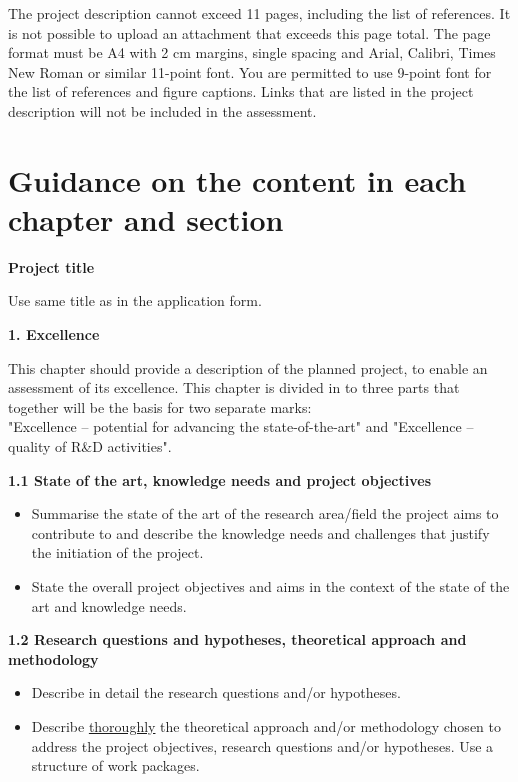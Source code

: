 \documentclass{nfr}
\begin{document}
The project description cannot exceed 11 pages, including the list of
references. It is not possible to upload an attachment that exceeds this
page total. The page format must be A4 with 2 cm margins, single spacing
and Arial, Calibri, Times New Roman or similar 11-point font. You are
permitted to use 9-point font for the list of references and figure
captions. Links that are listed in the project description will not be
included in the assessment.

\section{Guidance on the content in each chapter and section}

\textbf{Project title}

Use same title as in the application form.

\textbf{1. Excellence}

This chapter should provide a description of the planned project, to
enable an assessment of its excellence. This chapter is divided in to
three parts that together will be the basis for two separate marks:\\
"Excellence -- potential for advancing the state-of-the-art" and
"Excellence -- quality of R\&D activities".

\textbf{1.1 State of the art, knowledge needs and project objectives}

\begin{itemize}
\item
  Summarise the state of the art of the research area/field the project
  aims to contribute to and describe the knowledge needs and challenges
  that justify the initiation of the project.
\item
  State the overall project objectives and aims in the context of the
  state of the art and knowledge needs.
\end{itemize}

\textbf{1.2 Research questions and hypotheses, theoretical approach and
methodology}

\begin{itemize}
\item
  Describe in detail the research questions and/or hypotheses.
\item
  Describe \underline{thoroughly} the theoretical approach and/or methodology
  chosen to address the project objectives, research questions and/or
  hypotheses. Use a structure of work packages.
\end{itemize}
\end{document}
